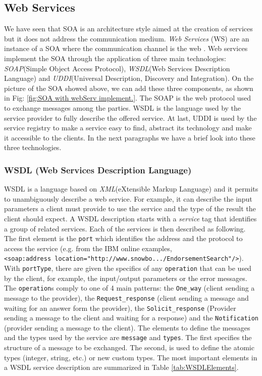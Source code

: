 \subsection{Web Services}
\label{WebServices}
We have seen that SOA is an architecture style aimed at the creation of services but it does not address the communication medium. \textit{Web Services} (WS) are an instance of a SOA where the communication channel is the web \cite{Pernici04}.
Web services implement the SOA through the application of three main technologies: \textit{SOAP}(Simple Object Access Protocol), \textit{WSDL}(Web Services Description Language) and \textit{UDDI}(Universal Description, Discovery and Integration).
On the picture of the SOA showed above, we can add these three components, as shown in Fig: \ref{fig:SOA with webServ implement.}. The SOAP is the web protocol used to exchange messages among the parties. WSDL is the language used by the service provider to fully describe the offered service. At last, UDDI is used by the service registry to make a service easy to find, abstract its technology and make it accessible to the clients.
In the next paragraphs we have a brief look into these three technologies.

\subsubsection{WSDL (Web Services Description Language) }
WSDL is a language based on \textit{XML}(eXtensible Markup Language) and it permits to unambiguously describe a web service. For example, it can describe the input parameters a client must provide to use the service and the type of the result the client should expect. 
A WSDL description starts with a \textit{service} tag that identifies a group of related services. Each of the services is then described as following.
The first element is the \verb|port| which identifies the address and the protocol to access the service (e.g. from the IBM online examples,\cite{IBMWSDL} \\
\verb|<soap:address location="http://www.snowbo.../EndorsementSearch"/>|). \\
With \verb|portType|, there are given the specifics of any \verb|operation| that can be used by the client, for example, the input/output parameters or the error messages. The \verb|operation|s comply to one of 4 main patterns: the \verb|One_way| (client sending a message to the provider), the \verb|Request_response| (client sending a message and waiting for an answer form the provider), the \verb|Solicit_response| (Provider sending a message to the client and waiting for a response) and the \verb|Notification| (provider sending a message to the client).
The elements to define the messages and the types used by the service are \verb|message| and \verb|types|. The first specifies the structure of a message to be exchanged. The second, is used to define the atomic types (integer, string, etc.) or new custom types. 
The most important elements in a WSDL service description are summarized in Table \ref{tab:WSDLElements}.


